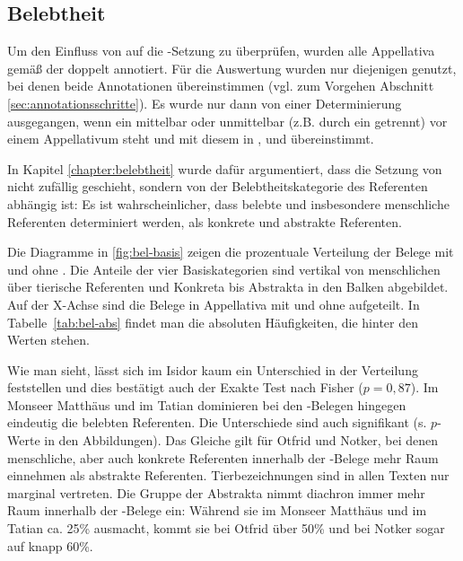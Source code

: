 \subsection{Belebtheit}\label{sec:ergeb-belebtheit}

Um den Einfluss von  auf die -Setzung zu überprüfen, wurden alle Appellativa  gemäß der  doppelt  annotiert. Für die Auswertung wurden nur diejenigen  genutzt, bei denen beide  Annotationen übereinstimmen (vgl. zum Vorgehen Abschnitt \ref{sec:annotationsschritte}). Es wurde nur dann von einer Determinierung ausgegangen, wenn ein  mittelbar oder unmittelbar (z.B. durch ein  getrennt) vor einem Appellativum  steht und mit diesem in ,  und   übereinstimmt.    


In Kapitel \ref{chapter:belebtheit} wurde dafür argumentiert, dass die Setzung von  nicht zufällig geschieht, sondern von der Belebtheitskategorie  des Referenten abhängig ist: Es ist wahrscheinlicher, dass belebte und insbesondere menschliche Referenten determiniert werden, als konkrete und abstrakte Referenten.

Die Diagramme in \ref{fig:bel-basis} zeigen die prozentuale Verteilung der Belege mit und ohne  . Die Anteile der vier Basiskategorien sind vertikal von menschlichen über tierische Referenten und Konkreta  bis Abstrakta  in den Balken abgebildet. Auf der X-Achse sind die Belege in Appellativa  mit   und ohne   aufgeteilt.  In Tabelle~\ref{tab:bel-abs} findet man die absoluten Häufigkeiten, die hinter den Werten stehen.

Wie man sieht, lässt sich im Isidor kaum ein Unterschied in der Verteilung feststellen und dies bestätigt auch der Exakte Test nach Fisher ($p = 0,87$). Im Monseer Matthäus und im Tatian dominieren bei den -Belegen hingegen eindeutig die belebten Referenten. Die Unterschiede sind auch signifikant (s. $p$-Werte in den Abbildungen). Das Gleiche gilt für Otfrid und Notker, bei denen menschliche, aber auch konkrete Referenten innerhalb der -Belege mehr Raum einnehmen als abstrakte Referenten. Tierbezeichnungen sind in allen Texten nur marginal vertreten. Die Gruppe der Abstrakta  nimmt diachron immer mehr Raum innerhalb der -Belege ein: Während sie im Monseer Matthäus und im Tatian ca. 25\% ausmacht, kommt sie bei Otfrid über 50\% und bei Notker sogar auf knapp 60\%. 


